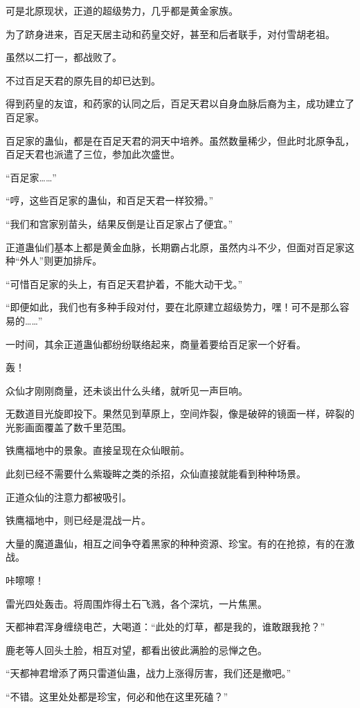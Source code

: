\begin{this_body}
可是北原现状，正道的超级势力，几乎都是黄金家族。

为了跻身进来，百足天居主动和药皇交好，甚至和后者联手，对付雪胡老祖。

虽然以二打一，都战败了。

不过百足天君的原先目的却已达到。

得到药皇的友谊，和药家的认同之后，百足天君以自身血脉后裔为主，成功建立了百足家。

百足家的蛊仙，都是在百足天君的洞天中培养。虽然数量稀少，但此时北原争乱，百足天君也派遣了三位，参加此次盛世。

“百足家……”

“哼，这些百足家的蛊仙，和百足天君一样狡猾。”

“我们和宫家别苗头，结果反倒是让百足家占了便宜。”

正道蛊仙们基本上都是黄金血脉，长期霸占北原，虽然内斗不少，但面对百足家这种“外人”则更加排斥。

“可惜百足家的头上，有百足天君护着，不能大动干戈。”

“即便如此，我们也有多种手段对付，要在北原建立超级势力，嘿！可不是那么容易的……”

一时间，其余正道蛊仙都纷纷联络起来，商量着要给百足家一个好看。

轰！

众仙才刚刚商量，还未谈出什么头绪，就听见一声巨响。

无数道目光旋即投下。果然见到草原上，空间炸裂，像是破碎的镜面一样，碎裂的光影画面覆盖了数千里范围。

铁鹰福地中的景象。直接呈现在众仙眼前。

此刻已经不需要什么紫璇眸之类的杀招，众仙直接就能看到种种场景。

正道众仙的注意力都被吸引。

铁鹰福地中，则已经是混战一片。

大量的魔道蛊仙，相互之间争夺着黑家的种种资源、珍宝。有的在抢掠，有的在激战。

咔嚓嚓！

雷光四处轰击。将周围炸得土石飞溅，各个深坑，一片焦黑。

天都神君浑身缠绕电芒，大喝道：“此处的灯草，都是我的，谁敢跟我抢？”

鹿老等人回头土脸，相互对望，都看出彼此满脸的忌惮之色。

“天都神君增添了两只雷道仙蛊，战力上涨得厉害，我们还是撤吧。”

“不错。这里处处都是珍宝，何必和他在这里死磕？”


\end{this_body}
